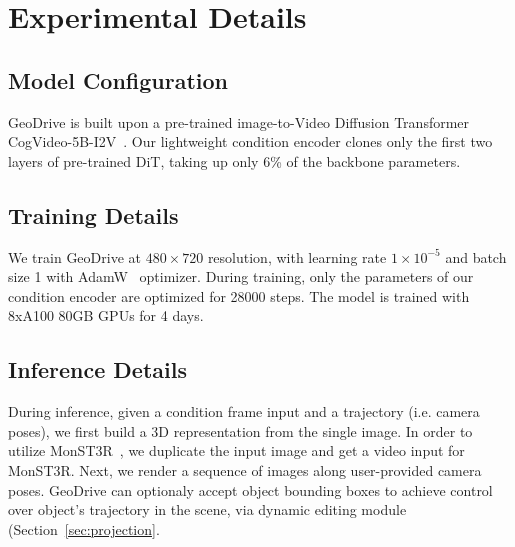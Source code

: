 \documentclass{article}
\newcommand{\secref}[1]{Sec.~\ref{#1}}
\begin{document}



\section{Experimental Details}
\label{sec:append_exp_details}

\subsection{Model Configuration}
GeoDrive is built upon a pre-trained image-to-Video Diffusion
Transformer CogVideo-5B-I2V~\cite{hong2022cogvideo}. Our lightweight condition encoder clones only the first two layers of
pre-trained DiT, taking up only 6\% of the backbone parameters.


\subsection{Training Details}
We train GeoDrive at $480 \times 720$ resolution, with learning rate $1 \times 10^{-5}$ and batch size 1 with AdamW~\cite{kingma2014adam} optimizer. During training, only the parameters of our condition encoder are optimized for 28000 steps. The model is trained with 8xA100 80GB GPUs for 4 days.

\subsection{Inference Details}
During inference, given a condition frame input and a trajectory (i.e. camera poses), we first build a 3D representation from the single image. In order to utilize MonST3R~\cite{zhang2024monst3r}, we duplicate the input image and get a video input for MonST3R. Next, we render a sequence of images along user-provided camera poses. GeoDrive can optionaly accept object bounding boxes to achieve control over object's trajectory in the scene, via dynamic editing module (Section~\ref{sec:projection}.
\end{document}
